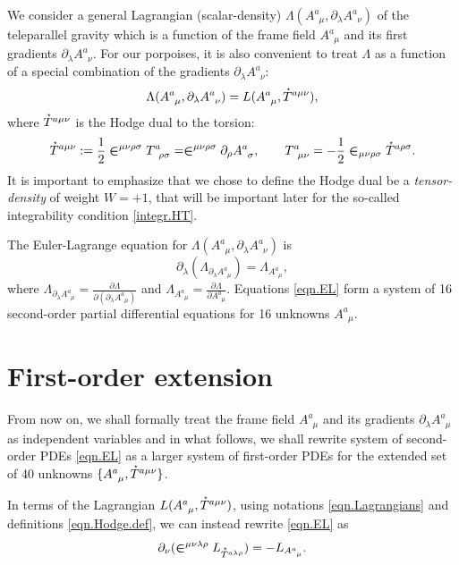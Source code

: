 \documentclass[
10pt, %
a4paper, %
oneside, %
headinclude,footinclude, %
BCOR5mm, %
]{scrartcl}
\newcommand{\pd}[1]{\partial_{#1}}
\newcommand{\tetr}[2]{A^{#1}_{\phantom{#1}#2}}
\newcommand{\D}[1]{\partial_{#1}} %
\newcommand{\Tors}[2]{T^{#1}_{\phantom{a}#2}}
\newcommand{\Lag}{\Lambda}	%
\newcommand{\Laghodge}{L}%
\newcommand{\LCsymb}{\bm{\in}}    %
\newcommand{\HDT}[1]{\accentset{\star}{T}^{#1}}
\begin{document}
We consider a general Lagrangian (scalar-density) $ \Lag(\tetr{a}{\mu},\pd{\lambda}\tetr{a}{\nu}) $ 
of the teleparallel gravity which is a function of the frame field $ \tetr{a}{\mu} $ and its first 
gradients $ \pd{\lambda}\tetr{a}{\nu} $. For our porpoises, it is also convenient to treat $ 
\Lag $ as a function of a special combination of the gradients $ \pd{\lambda}\tetr{a}{\nu} $:
\begin{equation}\label{eqn.Lagrangians}
\Lag(\tetr{a}{\mu},\pd{\lambda}\tetr{a}{\nu}) = 
\Laghodge(\tetr{a}{\mu},\HDT{a\mu\nu}),
\end{equation}
where $ \HDT{a\mu\nu} $ is the Hodge dual to the 
torsion:
\begin{equation}\label{eqn.Hodge.def}
\HDT{a\mu\nu} := \frac{1}{2}\LCsymb^{\mu\nu\rho\sigma}\Tors{a}{\rho\sigma} = 
\LCsymb^{\mu\nu\rho\sigma}\D{\rho}\tetr{a}{\sigma}, \qquad \Tors{a}{\mu\nu} = 
-\frac{1}{2}\LCsymb_{\mu\nu\rho\sigma}\HDT{a\rho\sigma}.
\end{equation}
It is important to emphasize that we chose to define the Hodge dual be a 
\emph{tensor-density} of weight $ W=+1 $, that will be important later for 
the so-called integrability condition \eqref{integr.HT}.



The Euler-Lagrange equation for $ \Lag(\tetr{a}{\mu},\pd{\lambda}\tetr{a}{\nu}) $ is
\begin{equation}\label{eqn.EL}
\pd{\lambda}(\Lag_{\pd{\lambda}\tetr{a}{\mu}}) = \Lag_{\tetr{a}{\mu}},
\end{equation}
where $ \Lag_{\pd{\lambda}\tetr{a}{\mu}} = \frac{\partial 
\Lag}{\partial(\pd{\lambda}\tetr{a}{\mu})} $ and $ 
\Lag_{\tetr{a}{\mu}} = \frac{\partial \Lag}{\partial\tetr{a}{\mu}} $. Equations \eqref{eqn.EL} 
form a system of 16 second-order partial differential equations for 16 unknowns $ \tetr{a}{\mu} $.


\section{First-order extension}

From now on, we shall formally treat the frame field $ \tetr{a}{\mu} $ and its gradients $ 
\pd{\lambda}\tetr{a}{\mu} $ as independent variables and in what follows, we shall rewrite system 
of second-order PDEs \eqref{eqn.EL} as a larger system of first-order PDEs for the extended set of 
40 unknowns $ \{ \tetr{a}{\mu},\HDT{a\mu\nu}\} $.


In terms of the Lagrangian $ \Laghodge(\tetr{a}{\mu},\HDT{a\mu\nu}) $, using notations 
\eqref{eqn.Lagrangians} and definitions 
\eqref{eqn.Hodge.def}, we can instead
rewrite \eqref{eqn.EL} as
\begin{equation}\label{eqn.EM.Hodge}
\D{\nu}(\LCsymb^{\mu\nu\lambda\rho}\Laghodge_{\HDT{a\lambda\rho}}) 
=-\Laghodge_{\tetr{a}{\mu}}.
\end{equation}
\end{document}
